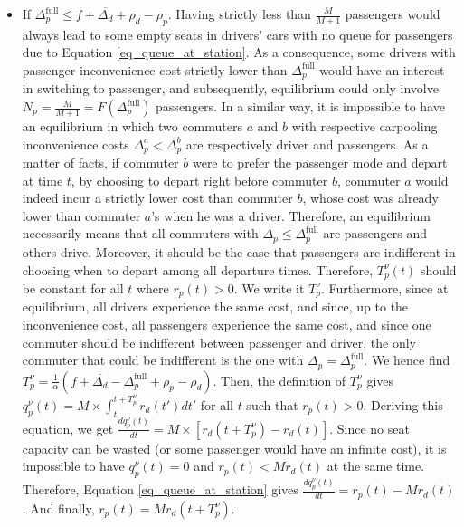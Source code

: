 \documentclass[english, a4paper]{article}
\theoremstyle{plain}
\theoremstyle{definition}
\theoremstyle{remark}
\begin{document}
\begin{itemize}
    \item If $\Delta _p^{\text{full}} \leq f + \overline{\Delta _d} + \rho _d - \rho _p$. Having strictly less than $\frac{M}{M+1}$ passengers would always lead to some empty seats in drivers’ cars with no queue for passengers due to Equation \ref{eq_queue_at_station}. As a consequence, some drivers with passenger inconvenience cost strictly lower than $\Delta _p^{\text{full}}$ would have an interest in switching to passenger, and subsequently, equilibrium could only involve $N_p = \frac{M}{M+1} = F(\Delta _p^{\text{full}})$ passengers. In a similar way, it is impossible to have an equilibrium in which two commuters $a$ and $b$ with respective carpooling inconvenience costs $\Delta_p^a < \Delta_p^b$ are respectively driver and passengers. As a matter of facts, if commuter $b$ were to prefer the passenger mode and depart at time $t$, by choosing to depart right before commuter $b$, commuter $a$ would indeed incur a strictly lower cost than commuter $b$, whose cost was already lower than commuter $a$’s when he was a driver. Therefore, an equilibrium necessarily means that all commuters with $\Delta _p \leq \Delta _p^{\text{full}}$ are passengers and others drive. Moreover, it should be the case that passengers are indifferent in choosing when to depart among all departure times. Therefore, $T^{\nu}_p(t)$ should be constant for all $t$ where $r_p(t) > 0$. We write it $T^{\nu}_p$. Furthermore, since at equilibrium, all drivers experience the same cost, and since, up to the inconvenience cost, all passengers experience the same cost, and since one commuter should be indifferent between passenger and driver, the only commuter that could be indifferent is the one with $\Delta _p = \Delta_p^{\text{full}}$. We hence find $T^{\nu}_p = \frac{1}{\alpha} (f + \overline{\Delta _d} - \Delta _p ^{\text{full}} + \rho _p - \rho _d)$. Then, the definition of $T^{\nu}_p$ gives $q_p^{\nu}(t) = M\times \int _t^{t+ T^{\nu}_p} r_d(t') dt'$ for all $t$ such that $r_p(t) >0$. Deriving this equation, we get $\frac{dq_p^{\nu}(t)}{dt} = M\times [r_d(t + T_p^{\nu}) - r_d(t)]$. Since no seat capacity can be wasted (or some passenger would have an infinite cost), it is impossible to have $q_p^{\nu}(t) = 0$ and $r_p(t) < Mr_d(t)$ at the same time. Therefore, Equation \ref{eq_queue_at_station} gives $\frac{dq_p^{\nu}(t)}{dt} = r_p(t) - Mr_d(t)$. And finally, $r_p(t) = Mr_d(t+ T^{\nu}_p)$.


\end{itemize}
\end{document}
